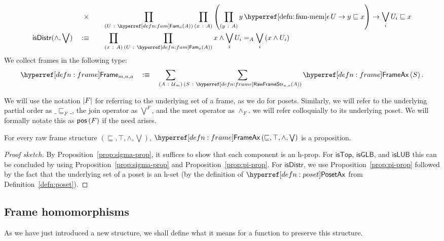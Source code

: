 \begin{defn}[Frame]
\begin{alignat*}{2}
         &\hspace{0.55em}\times &&\pity{U}{\sub{o}{A}}{\pity{x}{A}{
        \left( \pity{y}{A}{\memfam{y}{U} \rightarrow y \sqsubseteq x}\right) \rightarrow \bigvee_i U_i \sqsubseteq x }}\\
    \mathsf{isDistr}(\wedge, \bigvee) \quad&\is\quad
      &&\pity{x}{A}{\pity{U}{\sub{o}{A}}{
          x \wedge \bigvee_i U_i} =_A \bigvee_i \left( x \wedge U_i \right)
      }
  \end{alignat*}
  We collect frames in the following type:
  \begin{equation*}
    \framety{m}{n}{o} \quad\is\quad
      \sigmaty{A}{\univ{}_m}{
        \sigmaty{S}{\rawframestr{n}{o}{A}}{\frameax{S}}
      }.
  \end{equation*}
\end{defn}

We will use the notation $\left| F \right|$ for referring to the underlying set of a frame, as we
do for posets. Similarly, we will refer to the underlying partial order as $\_\sqsubseteq_F\_$, the
join operator as $\bigvee^F$, and the meet operator as $\wedge_F$. we will refer colloquially to its
underlying poset. We will formally notate this as $\mathsf{pos}\left(F\right)$ if the need arises.

\begin{prop}\label{prop:frame-ax-prop}
  For every raw frame structure $(\sqsubseteq, \top, \wedge, \bigvee)$, $\frameax{\sqsubseteq, \top, \wedge, \bigvee}$ is a proposition.
\end{prop}
\begin{proof}[Proof sketch]
  By Proposition~\ref{prop:sigma-prop}, it suffices to show that each component is an
  h-prop. For $\mathsf{isTop}$, $\mathsf{isGLB}$, and $\mathsf{isLUB}$ this can be
  concluded by using Proposition~\ref{prop:sigma-prop} and Proposition~\ref{prop:pi-prop}.
  For $\mathsf{isDistr}$, we use Proposition~\ref{prop:pi-prop} followed by the fact that
  the underlying set of a poset is an h-set (by the definition of $\posetaxnm{}$ from
  Definition~\ref{defn:poset}).
\end{proof}

\subsection{Frame homomorphisms}

As we have just introduced a new structure, we shall define what it means for a function
to preserve this structure.

